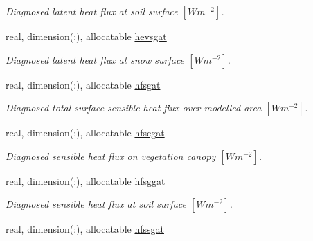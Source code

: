 \begin{DoxyCompactItemize}
\begin{DoxyCompactList}\small\item\em Diagnosed latent heat flux at soil surface $[W m^{-2} ]$. \end{DoxyCompactList}\item 
\hypertarget{structclass__statevars_1_1class__gather_a70cebd3e956990e22b9cfe4eb039a060}{}real, dimension(\+:), allocatable \hyperlink{structclass__statevars_1_1class__gather_a70cebd3e956990e22b9cfe4eb039a060}{hevsgat}\label{structclass__statevars_1_1class__gather_a70cebd3e956990e22b9cfe4eb039a060}

\begin{DoxyCompactList}\small\item\em Diagnosed latent heat flux at snow surface $[W m^{-2} ]$. \end{DoxyCompactList}\item 
\hypertarget{structclass__statevars_1_1class__gather_a2f8175e90c261bf704890a2bfbf19646}{}real, dimension(\+:), allocatable \hyperlink{structclass__statevars_1_1class__gather_a2f8175e90c261bf704890a2bfbf19646}{hfsgat}\label{structclass__statevars_1_1class__gather_a2f8175e90c261bf704890a2bfbf19646}

\begin{DoxyCompactList}\small\item\em Diagnosed total surface sensible heat flux over modelled area $[W m^{-2} ]$. \end{DoxyCompactList}\item 
\hypertarget{structclass__statevars_1_1class__gather_a888237e4744c548538ae42dcddf1b3d3}{}real, dimension(\+:), allocatable \hyperlink{structclass__statevars_1_1class__gather_a888237e4744c548538ae42dcddf1b3d3}{hfscgat}\label{structclass__statevars_1_1class__gather_a888237e4744c548538ae42dcddf1b3d3}

\begin{DoxyCompactList}\small\item\em Diagnosed sensible heat flux on vegetation canopy $[W m^{-2} ]$. \end{DoxyCompactList}\item 
\hypertarget{structclass__statevars_1_1class__gather_a4b180294efc85d5de2365fa3a7f8640a}{}real, dimension(\+:), allocatable \hyperlink{structclass__statevars_1_1class__gather_a4b180294efc85d5de2365fa3a7f8640a}{hfsggat}\label{structclass__statevars_1_1class__gather_a4b180294efc85d5de2365fa3a7f8640a}

\begin{DoxyCompactList}\small\item\em Diagnosed sensible heat flux at soil surface $[W m^{-2} ]$. \end{DoxyCompactList}\item 
\hypertarget{structclass__statevars_1_1class__gather_a6ca6a3c0af0d343bf9ecb80ab691d9b0}{}real, dimension(\+:), allocatable \hyperlink{structclass__statevars_1_1class__gather_a6ca6a3c0af0d343bf9ecb80ab691d9b0}{hfssgat}\label{structclass__statevars_1_1class__gather_a6ca6a3c0af0d343bf9ecb80ab691d9b0}


\end{DoxyCompactItemize}

